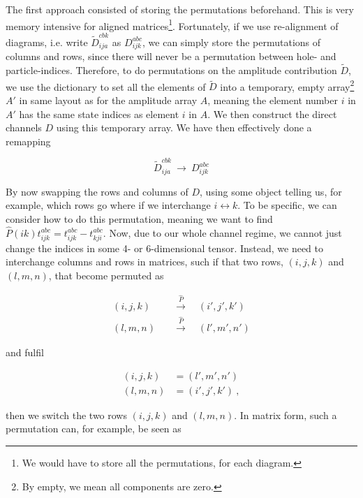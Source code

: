 	The first approach consisted of storing the permutations beforehand. This is very memory intensive for aligned matrices\footnote{We would have to store all the permutations, for each diagram.}. Fortunately, if we use re-alignment of diagrams, i.e. write $\tilde{D}_{ija}^{cbk}$ as $D_{ijk}^{abc}$, we can simply store the permutations of columns and rows, since there will never be a permutation between hole- and particle-indices. Therefore, to do permutations on the amplitude contribution $\tilde{D}$, we use the dictionary to set all the elements of $\tilde{D}$ into a temporary, empty array\footnote{By empty, we mean all components are zero.} $A'$ in same layout as for the amplitude array $A$, meaning the element number $i$ in $A'$ has the same state indices as element $i$ in $A$. We then construct the direct channels $D$ using this temporary array. We have then effectively done a remapping
	
	\begin{equation}
		\tilde{D}_{ija}^{cbk} \:\rightarrow\: D_{ijk}^{abc}
	\end{equation}
	
	By now swapping the rows and columns of $D$, using some object telling us, for example, which rows go where if we interchange $i\leftrightarrow k$. To be specific, we can consider how to do this permutation, meaning we want to find $\hat{P}(ik)t_{ijk}^{abc} = t_{ijk}^{abc} - t_{kji}^{abc}$. Now, due to our whole channel regime, we cannot just change the indices in some 4- or 6-dimensional tensor. Instead, we need to interchange columns and rows in matrices, such if that two rows, $(i,j,k)$ and $(l,m,n)$, that become permuted as
	
	\begin{align}
	(i,j,k) \quad&\overset{\hat{P}}{\longrightarrow}\quad (i',j',k') \\
	(l,m,n) \quad&\overset{\hat{P}}{\longrightarrow}\quad (l',m',n')
	\end{align}
	
	and fulfil
	
	\begin{align}
	(i,j,k) &= (l',m',n') \\
	(l,m,n) &= (i',j',k') \:,
	\end{align}
	
	then we switch the two rows $(i,j,k)$ and $(l,m,n)$. In matrix form, such a permutation can, for example, be seen as
	

